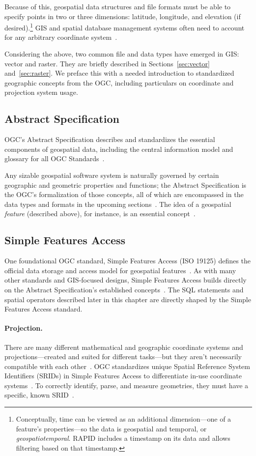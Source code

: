 Because of this, geospatial data structures and file formats must be able to specify points in two or three dimensions: latitude, longitude, and elevation (if desired).\footnote{Conceptually, time can be viewed as an additional dimension---one of a feature's properties---so the data is geospatial and temporal, or \textit{geospatiotemporal}. RAPID includes a timestamp on its data and allows filtering based on that timestamp.} GIS and spatial database management systems often need to account for any arbitrary coordinate system~\cite{gentle_intro}.

Considering the above, two common file and data types have emerged in GIS: vector and raster. They are briefly described in Sections~\ref{sec:vector} and~\ref{sec:raster}. We preface this with a needed introduction to standardized geographic concepts from the OGC, including particulars on coordinate and projection system usage.

\subsection{Abstract Specification}
OGC's Abstract Specification describes and standardizes the essential components of geospatial data, including the central information model and glossary for all OGC Standards~\cite{AbstractSpecFaq}.

Any sizable geospatial software system is naturally governed by certain geographic and geometric properties and functions; the Abstract Specification is the OGC's formalization of those concepts, all of which are encompassed in the data types and formats in the upcoming sections~\cite{AbstractSpecFaq}. The idea of a geospatial \textit{feature} (described above), for instance, is an essential concept~\cite{Kottman2009,AbstractSpecFaq}.

\subsection{Simple Features Access}
One foundational OGC standard, Simple Features Access (ISO 19125) defines the official data storage and access model for geospatial features~\cite{SFA}. As with many other standards and GIS-focused designs, Simple Features Access builds directly on the Abstract Specification's established concepts~\cite{SFA,AbstractSpecFaq}. The SQL statements and spatial operators described later in this chapter are directly shaped by the Simple Features Access standard.

\paragraph{Projection.}
There are many different mathematical and geographic coordinate systems and projections---created and suited for different tasks---but they aren't necessarily compatible with each other~\cite{Kottman2009}. OGC standardizes unique Spatial Reference System Identifiers (SRIDs) in Simple Features Access to differentiate in-use coordinate systems~\cite{SFA}. To correctly identify, parse, and measure geometries, they must have a specific, known SRID~\cite{Kottman2009}.
  
